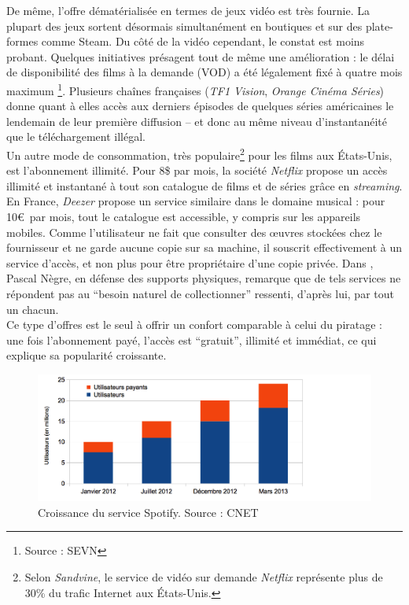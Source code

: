 \documentclass[a4paper]{report}
\begin{document}
	De même, l'offre dématérialisée en termes de jeux vidéo est très fournie. La plupart des jeux sortent désormais simultanément en boutiques et sur des plate-formes comme Steam. Du côté de la vidéo cependant, le constat est moins probant. Quelques initiatives présagent tout de même une amélioration : le délai de disponibilité des films à la demande (VOD) a été légalement fixé à quatre mois maximum \footnote{Source : SEVN}. Plusieurs chaînes françaises (\emph{TF1 Vision}, \emph{Orange Cinéma Séries}) donne quant à elles accès aux derniers épisodes de quelques séries américaines le lendemain de leur première diffusion – et donc au même niveau d'instantanéité que le téléchargement illégal.\\

	Un autre mode de consommation, très populaire\footnote{Selon \emph{Sandvine}, le service de vidéo sur demande \emph{Netflix} représente plus de 30\% du trafic Internet aux États-Unis.} pour les films aux États-Unis, est l'abonnement illimité. Pour 8\$ par mois, la société \emph{Netflix} propose un accès illimité et instantané à tout son catalogue de films et de séries grâce en \emph{streaming}.\\

	En France, \emph{Deezer} propose un service similaire dans le domaine musical : pour 10\euro\ par mois, tout le catalogue est accessible, y compris sur les appareils mobiles. Comme l'utilisateur ne fait que consulter des œuvres stockées chez le fournisseur et ne garde aucune copie sur sa machine, il souscrit effectivement à un service d'accès, et non plus pour être propriétaire d'une copie privée. Dans \cite{podcast-industrie-musicale}, Pascal Nègre, en défense des supports physiques, remarque que de tels services ne répondent pas au ``besoin naturel de collectionner'' ressenti, d'après lui, par tout un chacun.\\

	Ce type d'offres est le seul à offrir un confort comparable à celui du piratage : une fois l'abonnement payé, l'accès est ``gratuit'', illimité et immédiat, ce qui explique sa popularité croissante.

	\begin{figure}[ht]
		\begin{center}
			\includegraphics[width=14cm]{images/spotify-croissance.png}
			\caption{Croissance du service Spotify. Source : CNET}
		\end{center}
	\end{figure}
\end{document}
